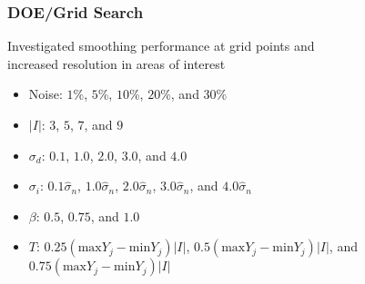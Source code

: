 \documentclass{beamer}
\begin{document}

\begin{frame}
\begin{center}
\frametitle{DOE/Grid Search}

Investigated smoothing performance at grid points and\\increased resolution in areas of interest\\

\begin{itemize}

\item Noise: $1$\%, $5$\%, $10$\%, $20$\%, and $30$\%

\item $\lvert I \rvert$: $3$, $5$, $7$, and $9$

\item $\sigma_d$: $0.1$, $1.0$, $2.0$, $3.0$, and $4.0$

\item $\sigma_i$: $0.1 \hat{\sigma}_n$, $1.0 \hat{\sigma}_n$, $2.0 \hat{\sigma}_n$, $3.0 \hat{\sigma}_n$,  and $4.0 \hat{\sigma}_n$

\item $\beta$: $0.5$, $0.75$, and $1.0$

\item $T$: $0.25 \left( \mathrm{max} Y_j - \mathrm{min} Y_j \right) \lvert I \rvert$, $0.5 \left( \mathrm{max} Y_j - \mathrm{min} Y_j \right) \lvert I \rvert$, and $0.75 \left( \mathrm{max} Y_j - \mathrm{min} Y_j \right) \lvert I \rvert$

\end{itemize}

\end{center}
\end{frame}

\end{document}
